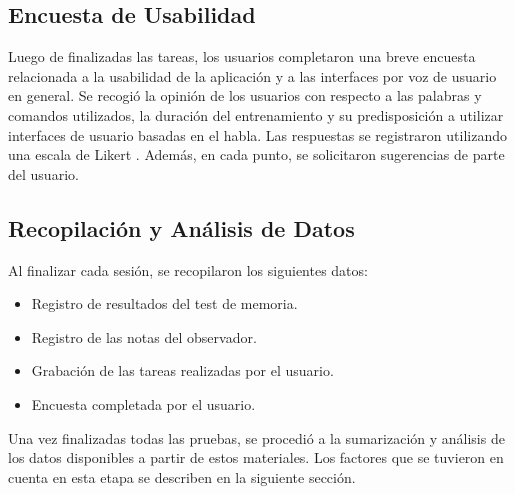 \subsection{Encuesta de Usabilidad}
Luego de finalizadas las tareas, los usuarios completaron una breve encuesta relacionada a la usabilidad de
la aplicaci\'on y a las interfaces por voz de usuario en general.
Se recogi\'o la opini\'on de los usuarios con respecto a las palabras y comandos utilizados, la duraci\'on del
entrenamiento y su predisposici\'on a utilizar interfaces de usuario basadas en el habla. Las respuestas se
registraron utilizando una escala de Likert \cite{Allen:2007}.
Adem\'as, en cada punto, se solicitaron sugerencias de parte del usuario. 	

\subsection{Recopilaci\'on y An\'alisis de Datos} 
Al finalizar cada sesi\'on, se recopilaron los siguientes datos:
	\begin{itemize}			
		\item Registro de resultados del test de memoria.
		\item Registro de las notas del observador.
		\item Grabaci\'on de las tareas realizadas por el usuario.
		\item Encuesta completada por el usuario.
	\end{itemize}

Una vez finalizadas todas las pruebas, se procedi\'o a la sumarizaci\'on y an\'alisis de los datos disponibles
a partir de estos materiales. Los factores que se tuvieron en cuenta en esta etapa se describen en la
siguiente secci\'on.

